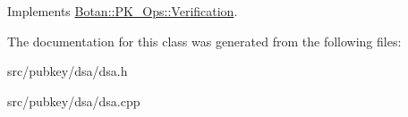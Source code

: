 Implements \hyperlink{classBotan_1_1PK__Ops_1_1Verification_af66d51b7b6ae5e9b851815df23f7db7c}{Botan\-::\-P\-K\-\_\-\-Ops\-::\-Verification}.



The documentation for this class was generated from the following files\-:\begin{DoxyCompactItemize}
\item 
src/pubkey/dsa/dsa.\-h\item 
src/pubkey/dsa/dsa.\-cpp\end{DoxyCompactItemize}
